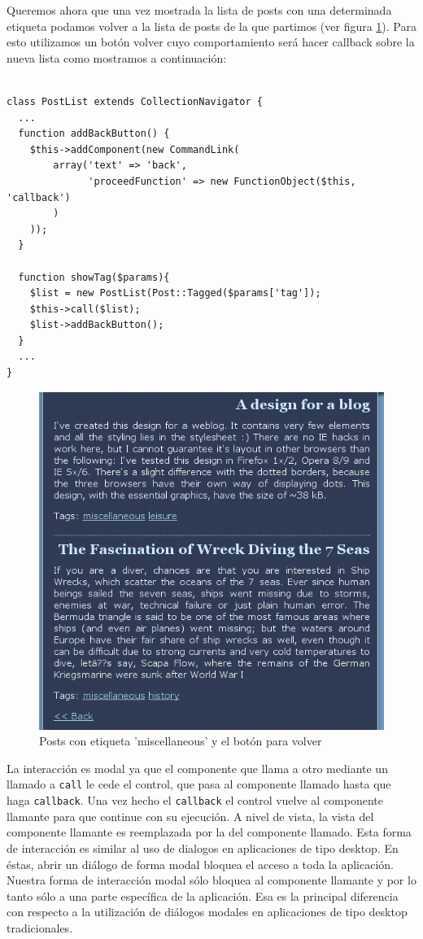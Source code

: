 Queremos ahora que una vez mostrada la lista de posts con una determinada etiqueta podamos volver a la lista de posts de la que partimos (ver figura \ref{fig-blog2}). Para esto utilizamos un botón volver cuyo comportamiento será hacer callback sobre la nueva lista como mostramos a continuación:

\begin{verbatim}

class PostList extends CollectionNavigator {
  ...
  function addBackButton() {
    $this->addComponent(new CommandLink(
        array('text' => 'back',
              'proceedFunction' => new FunctionObject($this, 'callback')
        )
    ));
  }

  function showTag($params){
    $list = new PostList(Post::Tagged($params['tag']);
    $this->call($list);
    $list->addBackButton();
  }
  ...
}

\end{verbatim}


\begin{figure}[h]
	\centering
	\includegraphics[scale=0.7]{images/blog2.png}
 	\caption{Posts con etiqueta 'miscellaneous' y el botón para volver}
 	\label{fig-blog2}
\end{figure}

La interacción es modal ya que el componente que llama a otro mediante un llamado a \verb"call" le cede el control, que pasa al componente llamado hasta que haga \verb'callback'. Una vez hecho el \verb'callback' el control vuelve al componente llamante para que continue con su ejecución. A nivel de vista, la vista del componente llamante es reemplazada por la del componente llamado. Esta forma de interacción es similar al uso de dialogos en aplicaciones de tipo desktop. En éstas, abrir un diálogo de forma modal bloquea el acceso a toda la aplicación. Nuestra forma de interacción modal sólo bloquea al componente llamante y por lo tanto sólo a una parte específica de la aplicación. Esa es la principal diferencia con respecto a la utilización de diálogos modales en aplicaciones de tipo desktop tradicionales.

